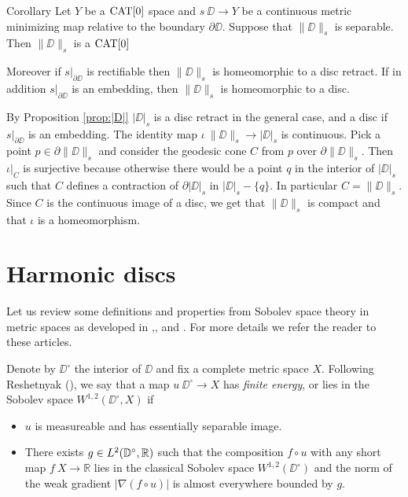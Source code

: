 \documentclass{article}
\begin{document}
\begin{thm}{Corollary}\label{cor:main}
Let $Y$ be a $\mathop{\rm CAT}\nolimits[0]$ space 
and $s\:\DD\to Y$ be a continuous metric minimizing map relative to the boundary $\partial\DD$.
Suppose that $\|\DD\|_s$  is separable.
Then $\|\DD\|_s$ is a $\mathop{\rm CAT}\nolimits[0]$

Moreover if $s|_{\partial\DD}$ is rectifiable then $\|\DD\|_s$ is homeomorphic to a  disc retract. 
If in addition  $s|_{\partial\DD}$ is an embedding,
then $\|\DD\|_s$ is homeomorphic to a disc.
\end{thm}

By Proposition \ref{prop:|D|} $|\DD|_s$ is a disc retract in the general case, and a disc if $s|_{\partial\DD}$ is an embedding.
The identity map $\iota\:\|\DD\|_s\to |\DD|_s$ is continuous.
Pick a point $p\in\partial\|\DD\|_s$ and consider the geodesic 
cone $C$ from $p$ over $\partial\|\DD\|_s$.
Then $\iota|_C$ is surjective because otherwise there would be a point $q$ in the 
interior of $|\DD|_s$ such that $C$ defines a contraction of $\partial|\DD|_s$ in $|\DD|_s-\{q\}$. 
In particular $C=\|\DD\|_s$.
Since $C$ is the continuous image of a disc, we get that $\|\DD\|_s$ is compact and that $\iota$ is a homeomorphism.
\qeds

\section{Harmonic discs}\label{Harmonic discs}

Let us review some definitions and properties from Sobolev space theory in metric spaces as developed in 
\cite{KS},\cite{R}, \cite{HKST} and \cite{LW}. 
For more details we refer the reader to these articles.

Denote by  $\DD^\circ$ the interior of $\DD$ and fix a complete metric space $X$.
Following Reshetnyak (\cite{R}), we say that a map $u\:\DD^\circ\to X$ has {\em finite energy}, or lies in the Sobolev space $W^{1,2}(\DD^\circ,X)$ if
\begin{itemize}
 \item $u$ is measureable and has essentially separable image. %
 \item There exists $g\in L^2(\mathbb{D}^\circ,\mathbb{R})$ such that the composition $f\circ u$ with any short map $f\:X\to \mathbb{R}$ 
lies in the classical Sobolev space $W^{1,2}(\DD^\circ)$
 and the norm of the weak gradient $|\nabla(f\circ u)|$ is almost everywhere bounded by $g$.
\end{itemize}
\end{document}
